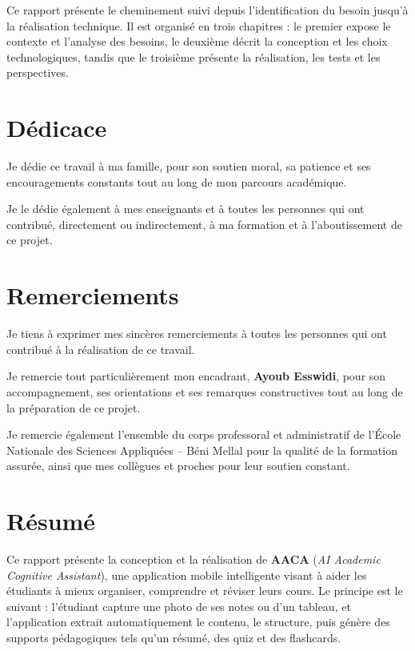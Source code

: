 \documentclass[12pt,a4paper]{report}
\newcommand{\school}{École Nationale des Sciences Appliquées -- Béni Mellal}
\newcommand{\supervisor}{Ayoub Esswidi}
\begin{document}
Ce rapport présente le cheminement suivi depuis l'identification du besoin jusqu'à la réalisation technique. Il est organisé en trois chapitres : le premier expose le contexte et l'analyse des besoins, le deuxième décrit la conception et les choix technologiques, tandis que le troisième présente la réalisation, les tests et les perspectives.

\chapter*{Dédicace}

Je dédie ce travail à ma famille, pour son soutien moral, sa patience et ses encouragements constants tout au long de mon parcours académique.

Je le dédie également à mes enseignants et à toutes les personnes qui ont contribué, directement ou indirectement, à ma formation et à l'aboutissement de ce projet.

\chapter*{Remerciements}

Je tiens à exprimer mes sincères remerciements à toutes les personnes qui ont contribué à la réalisation de ce travail.

Je remercie tout particulièrement mon encadrant, \textbf{\supervisor}, pour son accompagnement, ses orientations et ses remarques constructives tout au long de la préparation de ce projet.

Je remercie également l'ensemble du corps professoral et administratif de l'\school{} pour la qualité de la formation assurée, ainsi que mes collègues et proches pour leur soutien constant.

\chapter*{Résumé}

Ce rapport présente la conception et la réalisation de \textbf{AACA} (\textit{AI Academic Cognitive Assistant}), une application mobile intelligente visant à aider les étudiants à mieux organiser, comprendre et réviser leurs cours. Le principe est le suivant : l'étudiant capture une photo de ses notes ou d'un tableau, et l'application extrait automatiquement le contenu, le structure, puis génère des supports pédagogiques tels qu'un résumé, des quiz et des flashcards.
\end{document}
